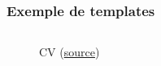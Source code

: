 \begin{frame}[fragile]
  \frametitle{Exemple de templates}

  \begin{columns}[c]
        \begin{figure}[h]
          \def\figurename{Exemple 1}
          \caption{CV (\href{https://www.latextemplates.com/template/developer-cv}{source})}
        \end{figure}
        \begin{figure}[h]
          \def\figurename{Exemple 2}

\end{figure}
\end{columns}
\end{frame}

